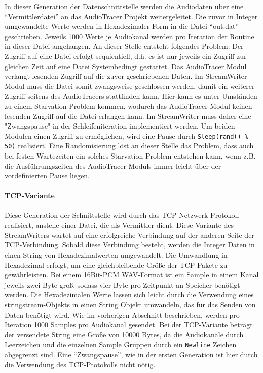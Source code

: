 In dieser Generation der Datenschnittstelle werden die Audiodaten über eine \enquote{Vermittlerdatei} an das AudioTracer Projekt weitergeleitet. 
Die zuvor in Integer umgewandelte Werte werden in Hexadezimaler Form in die Datei \enquote{out.dat} geschrieben.
Jeweils 1000 Werte je Audiokanal werden pro Iteration der Routine in dieser Datei angehangen.
An dieser Stelle entsteht folgendes Problem: Der Zugriff auf eine Datei erfolgt sequientiell, d.h. es ist nur jeweils ein Zugriff zur gleichen Zeit auf eine Datei Systembedingt gestattet.
Das AudioTracer Modul verlangt lesenden Zugriff auf die zuvor geschriebenen Daten.
Im StreamWriter Modul muss die Datei somit zwangsweise geschlossen werden, damit ein weiterer Zugriff seitens des AudioTracers stattfinden kann. 
Hier kann es unter Umständen zu einem Starvation-Problem kommen, wodurch das AudioTracer Modul keinen lesenden Zugriff auf die Datei erlangen kann.
Im StreamWriter muss daher eine "Zwangspause" in der Schleifeniteration implementiert werden. Um beiden Modulen einen Zugriff zu ermöglichen, wird eine Pause durch \texttt{Sleep(rand() \% 50)} realisiert.
Eine Randomisierung löst an dieser Stelle das Problem, dass auch bei festen Wartezeiten ein solches Starvation-Problem entstehen kann, wenn z.B. die Ausführungszeiten des AudioTracer Moduls immer leicht über der vordefinierten Pause liegen.

\paragraph{TCP-Variante}

Diese Generation der Schnittstelle wird durch das TCP-Netzwerk Protokoll realisiert, anstelle einer Datei, die als Vermittler dient. 
Diese Variante des StreamWriters wartet auf eine erfolgreiche Verbindung auf der anderen Seite der TCP-Verbindung. 
Sobald diese Verbindung besteht, werden die Integer Daten in einen String von Hexadezimalwerten umgewandelt. Die Umwandlung in Hexadezimal erfolgt, um eine gleichbleibende Größe der TCP-Pakete zu gewährleisten.
Bei einem 16Bit-PCM WAV-Format ist ein Sample in einem Kanal jeweils zwei Byte groß, sodass vier Byte pro Zeitpunkt an Speicher benötigt werden. 
Die Hexadezimalen Werte lassen sich leicht durch die Verwendung eines stringstream-Objekts in einen String Objekt umwandeln, das für das Senden von Daten benötigt wird. 
Wie im vorherigen Abschnitt beschrieben, werden pro Iteration 1000 Samples pro Audiokanal gesendet. 
Bei der TCP-Variante beträgt der versendete String eine Größe von 10000 Bytes, da die Audiokanäle durch Leerzeichen und die einzelnen Sample Gruppen durch ein \texttt{Newline} Zeichen abgegrenzt sind.
Eine ``Zwangspause'', wie in der ersten Generation ist hier durch die Verwendung des TCP-Ptotokolls nicht nötig.